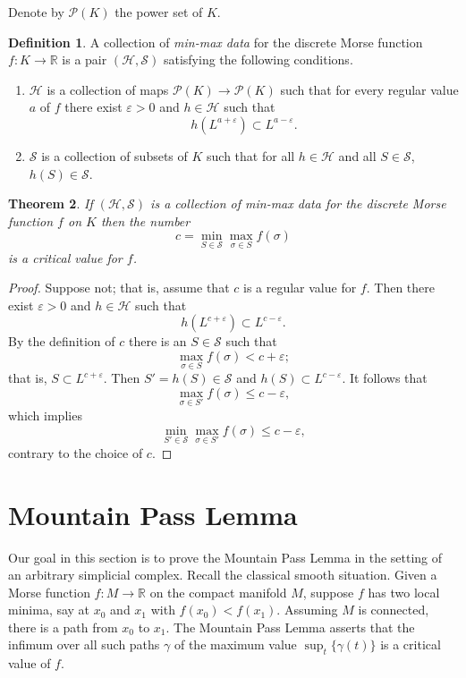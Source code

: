 \documentclass[11pt]{amsart}
\newtheorem{theorem}{Theorem}[section]
\theoremstyle{definition}
\newtheorem{definition}[theorem]{Definition}
\newcommand{\zr}{{\mathbb R}}
\begin{document}
Denote by ${\mathcal P}(K)$ the power set of $K$. 

\begin{definition}\label{minmaxdef} A collection of {\em min-max data} for the discrete Morse function $f:K\to\zr$ is a pair $({\mathcal H},{\mathcal S})$ satisfying the following conditions.
\begin{enumerate}
\item ${\mathcal H}$ is a collection of maps ${\mathcal P}(K) \to {\mathcal P}(K)$ such that for every regular value $a$ of $f$ there exist $\varepsilon >0$ and $h\in {\mathcal H}$ such that $$h(L^{a+\varepsilon})\subset L^{a-\varepsilon}.$$

\item ${\mathcal S}$ is a collection of subsets of $K$ such that for all $h\in {\mathcal H}$ and all $S\in {\mathcal S}$, $h(S)\in {\mathcal S}$.
\end{enumerate}
\end{definition}

\begin{theorem}\label{minmaxthm} If $({\mathcal H},{\mathcal S})$ is a collection of min-max data for the discrete Morse function $f$ on $K$ then the number $$c = \min_{S\in{\mathcal S}}\max_{\sigma\in S} f(\sigma)$$ is a critical value for $f$.
\end{theorem}

\begin{proof} Suppose not; that is, assume that $c$ is a regular value for $f$. Then there exist $\varepsilon >0$ and $h\in {\mathcal H}$ such that $$h(L^{c+\varepsilon})\subset L^{c-\varepsilon}.$$ By the definition of $c$ there is an $S\in {\mathcal S}$ such that $$\max_{\sigma\in S} f(\sigma) < c+\varepsilon;$$ that is, $S\subset L^{c+\varepsilon}$. Then $S' = h(S) \in {\mathcal S}$ and $h(S)\subset L^{c-\varepsilon}$. It follows that $$\max_{\sigma\in S'} f(\sigma) \le c-\varepsilon,$$ which implies $$\min_{S'\in{\mathcal S}}\max_{\sigma\in S'} f(\sigma) \le c-\varepsilon,$$ contrary to the choice of $c$.
\end{proof}


\section{Mountain Pass Lemma}\label{sec:mtnpass}

Our goal in this section is to prove the Mountain Pass Lemma in the setting of an arbitrary simplicial complex. Recall the classical smooth situation. Given a Morse function $f:M\to\zr$  on the compact manifold $M$, suppose $f$ has two local minima, say at $x_0$ and $x_1$ with $f(x_0)<f(x_1)$. Assuming $M$ is connected, there is a path from $x_0$ to $x_1$. The Mountain Pass Lemma asserts that the infimum over all such paths $\gamma$ of the maximum value $\sup_t \{\gamma(t)\}$ is a critical value of $f$. 
\end{document}
